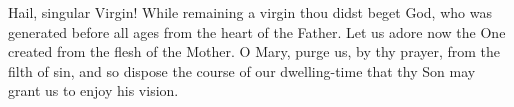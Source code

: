 \begin{enpars}\noindent Hail, singular Virgin! While remaining a virgin thou didst beget God, who was
generated before all ages from the heart of the Father. Let us adore now the
One created from the flesh of the Mother. O Mary, purge us, by thy prayer,
from the filth of sin, and so dispose the course of our dwelling-time that thy
Son may grant us to enjoy his vision.
\end{enpars}